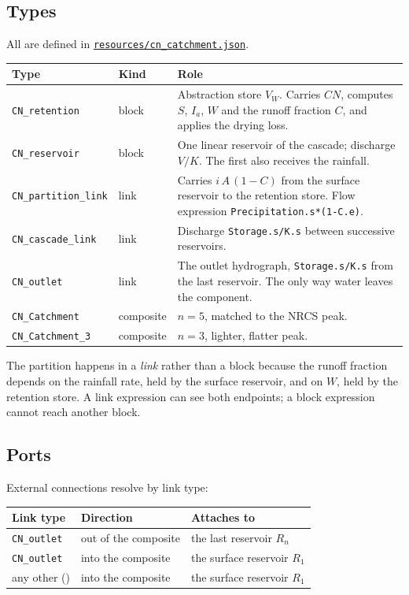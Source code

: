 \documentclass[11pt,a4paper]{article}
\newcommand{\code}[1]{\texttt{\small #1}}
\newcommand{\file}[1]{\texttt{\small #1}}
\newcommand{\ghbase}{https://github.com/ArashMassoudieh/OpenHydroQual/blob/master}
\newcommand{\exfile}[1]{\href{\ghbase/#1}{\file{#1}}}
\begin{document}
\subsection{Types}

All are defined in \exfile{resources/cn\_catchment.json}.

\begin{longtable}{@{}p{}p{}p{}@{}}
\toprule
\textbf{Type} & \textbf{Kind} & \textbf{Role}\\
\midrule
\endhead
\code{CN\_retention} & block & Abstraction store $V_W$. Carries $CN$, computes
$S$, $I_a$, $W$ and the runoff fraction $C$, and applies the drying loss.\\
\code{CN\_reservoir} & block & One linear reservoir of the cascade; discharge
$V/K$. The first also receives the rainfall.\\
\code{CN\_partition\_link} & link & Carries $i\,A\,(1-C)$ from the surface
reservoir to the retention store. Flow expression
\code{Precipitation.s*(1-C.e)}.\\
\code{CN\_cascade\_link} & link & Discharge \code{Storage.s/K.s} between
successive reservoirs.\\
\code{CN\_outlet} & link & The outlet hydrograph, \code{Storage.s/K.s} from the
last reservoir. The only way water leaves the component.\\
\code{CN\_Catchment} & composite & $n=5$, matched to the NRCS peak.\\
\code{CN\_Catchment\_3} & composite & $n=3$, lighter, flatter peak.\\
\bottomrule
\end{longtable}

\noindent
The partition happens in a \emph{link} rather than a block because the runoff
fraction depends on the rainfall rate, held by the surface reservoir, and on
$W$, held by the retention store. A link expression can see both endpoints;
a block expression cannot reach another block.

\subsection{Ports}

External connections resolve by link type:

\begin{center}
\begin{tabular}{@{}lll@{}}
\toprule
\textbf{Link type} & \textbf{Direction} & \textbf{Attaches to}\\
\midrule
\code{CN\_outlet} & out of the composite & the last reservoir $R_n$\\
\code{CN\_outlet} & into the composite & the surface reservoir $R_1$\\
any other (\code{*}) & into the composite & the surface reservoir $R_1$\\
\bottomrule
\end{tabular}
\end{center}
\end{document}
